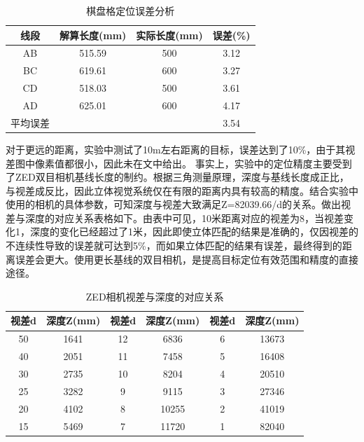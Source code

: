 \begin{table}[htb] %
	\centering
	\caption{棋盘格定位误差分析}
	\label{tab:5_棋盘格定位误差分析}
	\begin{small}
		\begin{tabular*}{\textwidth}{@{\extracolsep{\fill}}cccc} \toprule[2pt]
			线段 & 解算长度(mm) & 实际长度(mm) & 误差(\%) \\ \midrule[1pt]
			AB   & 515.59            & 500               & 3.12 \\
			BC   & 619.61            & 600                & 3.27 \\
			CD   & 518.03           & 500                & 3.61 \\
			AD   & 625.01           & 600                & 4.17 \\
			平均误差 &  &  & 3.54 \\
			\bottomrule[2pt]
		\end{tabular*}
	\end{small}
\end{table}

对于更远的距离，实验中测试了10m左右距离的目标，误差达到了10\%，由于其视差图中像素值都很小，因此未在文中给出。
事实上，实验中的定位精度主要受到了ZED双目相机基线长度的制约。根据三角测量原理，深度与基线长度成正比，与视差成反比，因此立体视觉系统仅在有限的距离内具有较高的精度。结合实验中使用的相机的具体参数，可知深度与视差大致满足Z=82039.66/d的关系。做出视差与深度的对应关系表格如下。由表中可见，10米距离对应的视差为8，当视差变化1，深度的变化已经超过了1米，因此即使立体匹配的结果是准确的，仅因视差的不连续性导致的误差就可达到5\%，而如果立体匹配的结果有误差，最终得到的距离误差会更大。使用更长基线的双目相机，是提高目标定位有效范围和精度的直接途径。

\begin{table}[htb] %
	\centering
	\caption{ZED相机视差与深度的对应关系}
	\label{tab:5_ZED相机视差与深度的对应关系}
	\begin{small}
		\begin{tabular*}{\textwidth}{@{\extracolsep{\fill}}cccccc} \toprule[2pt]
			视差d & 深度Z(mm) & 视差d & 深度Z(mm) & 视差d & 深度Z(mm) \\ \midrule[1pt]
			50      & 1641          & 12      & 6836         & 6        & 13673 \\
			40      & 2051         & 11       & 7458         & 5        & 16408 \\
			30      & 2735         & 10       & 8204        & 4        & 20510 \\
			25      & 3282         & 9        & 9115         & 3        & 27346 \\
			20      & 4102         & 8        & 10255       & 2        & 41019 \\
			15      & 5469         & 7        & 11720        & 1         & 82040 \\
			\bottomrule[2pt]
		\end{tabular*}
	\end{small}
\end{table}


